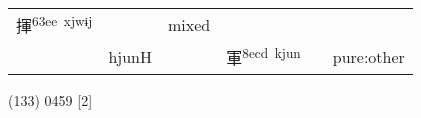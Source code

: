 \documentclass[14pt,a4paper]{scrartcl}
\begin{document}
\begin{longtable}[c]{@{}llllll@{}}
\begin{minipage}[t]{0.14\columnwidth}
揮\textsuperscript{63ee~xjwɨj}
\strut\end{minipage} &
\begin{minipage}[t]{0.14\columnwidth}\raggedright\strut
\strut\end{minipage} &
\begin{minipage}[t]{0.14\columnwidth}\raggedright\strut
mixed
\strut\end{minipage}\tabularnewline
\begin{minipage}[t]{0.14\columnwidth}\raggedright\strut
𠣞
\strut\end{minipage} &
\begin{minipage}[t]{0.14\columnwidth}\raggedright\strut
hjunH
\strut\end{minipage} &
\begin{minipage}[t]{0.14\columnwidth}\raggedright\strut
\strut\end{minipage} &
\begin{minipage}[t]{0.14\columnwidth}\raggedright\strut
軍\textsuperscript{8ecd~kjun}
\strut\end{minipage} &
\begin{minipage}[t]{0.14\columnwidth}\raggedright\strut
\strut\end{minipage} &
\begin{minipage}[t]{0.14\columnwidth}\raggedright\strut
pure:other
\strut\end{minipage}\tabularnewline
\bottomrule
\end{longtable}

(133) 0459 {[}2{]}
\end{document}
